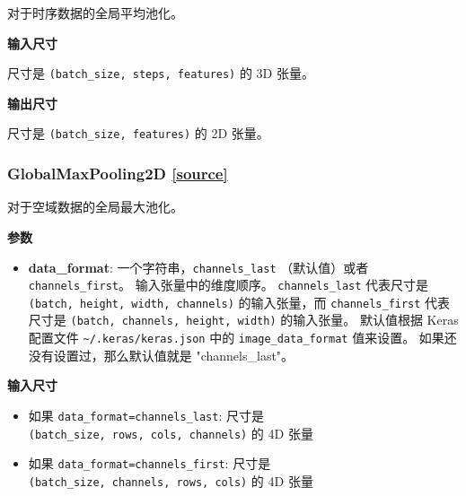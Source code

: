 \begin{Shaded}
\begin{Highlighting}[]
\end{Highlighting}
\end{Shaded}

对于时序数据的全局平均池化。

\textbf{输入尺寸}

尺寸是 \texttt{(batch\_size,\ steps,\ features)} 的 3D 张量。

\textbf{输出尺寸}

尺寸是 \texttt{(batch\_size,\ features)} 的 2D 张量。




\subsubsection{GlobalMaxPooling2D {\href{https://github.com/keras-team/keras/blob/master/keras/layers/pooling.py\#L545}{{[}source{]}}}}

\begin{Shaded}
\begin{Highlighting}[]
\OperatorTok{=}\NormalTok{)}
\end{Highlighting}
\end{Shaded}

对于空域数据的全局最大池化。

\textbf{参数}

\begin{itemize}
\tightlist
\item
  \textbf{data\_format}: 一个字符串，\texttt{channels\_last}
  （默认值）或者 \texttt{channels\_first}。 输入张量中的维度顺序。
  \texttt{channels\_last} 代表尺寸是
  \texttt{(batch,\ height,\ width,\ channels)} 的输入张量，而
  \texttt{channels\_first} 代表尺寸是
  \texttt{(batch,\ channels,\ height,\ width)} 的输入张量。 默认值根据
  Keras 配置文件 \texttt{\textasciitilde{}/.keras/keras.json} 中的
  \texttt{image\_data\_format} 值来设置。
  如果还没有设置过，那么默认值就是 "channels\_last"。
\end{itemize}

\textbf{输入尺寸}

\begin{itemize}
\tightlist
\item
  如果
  \texttt{data\_format=\textquotesingle{}channels\_last\textquotesingle{}}:
  尺寸是 \texttt{(batch\_size,\ rows,\ cols,\ channels)} 的 4D 张量
\item
  如果
  \texttt{data\_format=\textquotesingle{}channels\_first\textquotesingle{}}:
  尺寸是 \texttt{(batch\_size,\ channels,\ rows,\ cols)} 的 4D 张量
\end{itemize}

